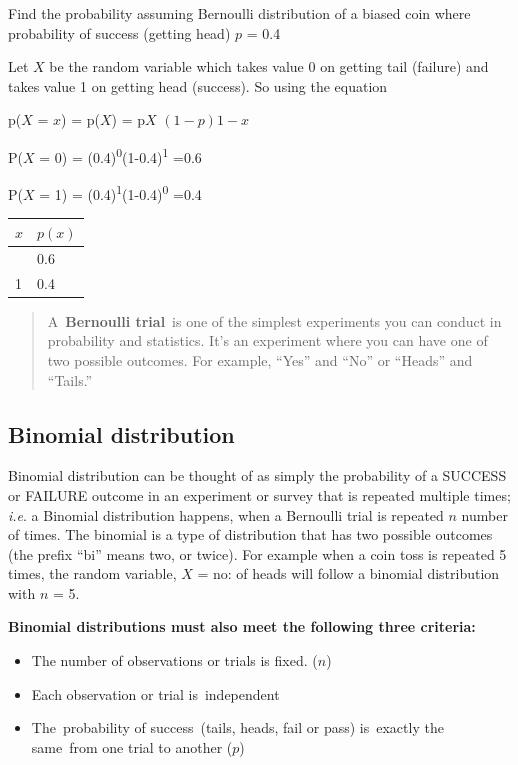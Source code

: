 \documentclass[
]{book}
\begin{document}
Find the probability assuming Bernoulli distribution of a biased coin
where probability of success (getting head) \(p\) = 0.4

Let \(X\) be the random variable which takes value 0 on getting tail
(failure) and takes value 1 on getting head (success). So using the
equation

p(\(X\) = \(x\)) = p(\(X\)) = p\(X\) \((1-p)\)\(1-x\)

P(\(X\) = 0) = (0.4)\textsuperscript{0}(1-0.4)\textsuperscript{1} =0.6

P(\(X\) = 1) = (0.4)\textsuperscript{1}(1-0.4)\textsuperscript{0} =0.4

\begin{longtable}[]{@{}ll@{}}
\toprule\noalign{}
\(x\) & \(p(x)\) \\
\midrule\noalign{}
\endhead
\bottomrule\noalign{}
\endlastfoot
0 & 0.6 \\
1 & 0.4 \\
\end{longtable}

\begin{quote}
A~\textbf{Bernoulli trial}~is one of the simplest experiments you can
conduct in probability and statistics. It's an experiment where you
can have one of two possible outcomes. For example, ``Yes'' and ``No'' or
``Heads'' and ``Tails.''
\end{quote}

\hypertarget{binomial-distribution}{%
\subsection{Binomial distribution}\label{binomial-distribution}}

Binomial distribution can be thought of as simply the probability of a
SUCCESS or FAILURE outcome in an experiment or survey that is repeated
multiple times; \emph{i.e}. a Binomial distribution happens, when a Bernoulli
trial is repeated \(n\) number of times. The binomial is a type of
distribution that has two possible outcomes (the prefix ``bi'' means two,
or twice). For example when a coin toss is repeated 5 times, the random
variable, \(X\) = no: of heads will follow a binomial distribution with
\(n\) = 5.

\textbf{Binomial distributions must also meet the following three criteria:}

\begin{itemize}
\item
  The number of observations or trials is fixed. (\(n\))
\item
  Each observation or trial is~independent
\item
  The~probability of success~(tails, heads, fail or pass) is~exactly
  the same~from one trial to another (\(p\))
\end{itemize}
\end{document}

